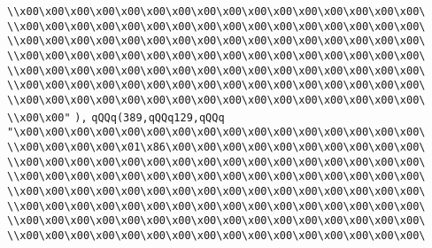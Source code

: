\verb|\\x00\x00\x00\x00\x00\x00\x00\x00\x00\x00\x00\x00\x00\x00\x00\x00\|\newline
\verb|\\x00\x00\x00\x00\x00\x00\x00\x00\x00\x00\x00\x00\x00\x00\x00\x00\|\newline
\verb|\\x00\x00\x00\x00\x00\x00\x00\x00\x00\x00\x00\x00\x00\x00\x00\x00\|\newline
\verb|\\x00\x00\x00\x00\x00\x00\x00\x00\x00\x00\x00\x00\x00\x00\x00\x00\|\newline
\verb|\\x00\x00\x00\x00\x00\x00\x00\x00\x00\x00\x00\x00\x00\x00\x00\x00\|\newline
\verb|\\x00\x00\x00\x00\x00\x00\x00\x00\x00\x00\x00\x00\x00\x00\x00\x00\|\newline
\verb|\\x00\x00\x00\x00\x00\x00\x00\x00\x00\x00\x00\x00\x00\x00\x00\x00\|\newline
\verb|\\x00\x00"|\newline
\verb|),|\newline
\verb|qQQq(389,qQQq129,qQQq|\newline
\verb|"\x00\x00\x00\x00\x00\x00\x00\x00\x00\x00\x00\x00\x00\x00\x00\x00\|\newline
\verb|\\x00\x00\x00\x00\x01\x86\x00\x00\x00\x00\x00\x00\x00\x00\x00\x00\|\newline
\verb|\\x00\x00\x00\x00\x00\x00\x00\x00\x00\x00\x00\x00\x00\x00\x00\x00\|\newline
\verb|\\x00\x00\x00\x00\x00\x00\x00\x00\x00\x00\x00\x00\x00\x00\x00\x00\|\newline
\verb|\\x00\x00\x00\x00\x00\x00\x00\x00\x00\x00\x00\x00\x00\x00\x00\x00\|\newline
\verb|\\x00\x00\x00\x00\x00\x00\x00\x00\x00\x00\x00\x00\x00\x00\x00\x00\|\newline
\verb|\\x00\x00\x00\x00\x00\x00\x00\x00\x00\x00\x00\x00\x00\x00\x00\x00\|\newline
\verb|\\x00\x00\x00\x00\x00\x00\x00\x00\x00\x00\x00\x00\x00\x00\x00\x00\|\newline
